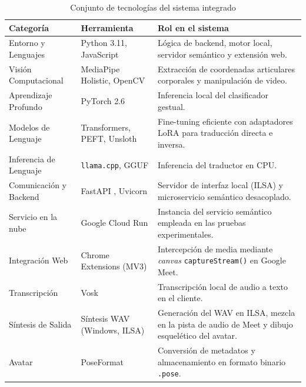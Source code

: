 \begin{table}[H]
\centering
\small
\setlength{\tabcolsep}{5pt}
\caption{Conjunto de tecnologías del sistema integrado}
\label{tab:stack}
\begin{tabularx}{\textwidth}{@{}>{\raggedright\arraybackslash}p{} 
                             >{\raggedright\arraybackslash}p{} 
                             >{\raggedright\arraybackslash}X@{}}
\toprule
\textbf{Categoría} & \textbf{Herramienta} & \textbf{Rol en el sistema} \\
\midrule
Entorno y Lenguajes & Python 3.11, JavaScript & Lógica de backend, motor local, servidor semántico y extensión web. \\
\addlinespace[3pt]
Visión Computacional & MediaPipe Holistic, OpenCV & Extracción de coordenadas articulares corporales y manipulación de video. \\
\addlinespace[3pt]
Aprendizaje Profundo & PyTorch 2.6 & Inferencia local del clasificador gestual. \\
\addlinespace[3pt]
Modelos de Lenguaje & Transformers, PEFT, Unsloth & Fine-tuning eficiente con adaptadores LoRA para traducción directa e inversa. \\
\addlinespace[3pt]
Inferencia de Lenguaje & \texttt{llama.cpp}, GGUF & Inferencia del traductor en CPU. \\
\addlinespace[3pt]
Comunicación y Backend & FastAPI \cite{tiangolo2018fastapi}, Uvicorn & Servidor de interfaz local (ILSA) y microservicio semántico desacoplado. \\
\addlinespace[3pt]
Servicio en la nube & Google Cloud Run & Instancia del servicio semántico empleada en las pruebas experimentales. \\
\addlinespace[3pt]
Integración Web & Chrome Extensions (MV3) & Intercepción de media mediante \textit{canvas} \texttt{captureStream()} en Google Meet. \\
\addlinespace[3pt]
Transcripción & Vosk & Transcripción local de audio a texto en el cliente. \\
\addlinespace[3pt]
Síntesis de Salida & Síntesis WAV (Windows, ILSA) & Generación del WAV en ILSA, mezcla en la pista de audio de Meet y dibujo esquelético del avatar. \\
\addlinespace[3pt]
Avatar & PoseFormat & Conversión de metadatos y almacenamiento en formato binario \texttt{.pose}. \\
\bottomrule
\end{tabularx}
\end{table}
